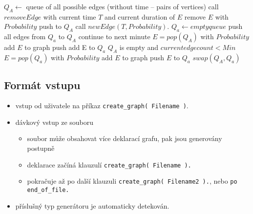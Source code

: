 \documentclass[11pt, a4paper,draft]{article}
\newcommand{\pl}[1]{\texttt{#1}} %
\theoremstyle{plain}
\theoremstyle{definition}
\theoremstyle{remark}
\begin{document}
\begin{algorithmic}[1]
    \State $Q_A \leftarrow$ queue of all possible edges (without time -- pairs of vertices)
            \State call $removeEdge$ with current time $T$ and current duration of $E$
            \State remove $E$ with $Probability$
             push to $Q_A$ \EndIf
        \EndFor
        \State call $newEdge( T, Probability )$.
        \State $Q_a \leftarrow empty queue$
                \State push all edges from $Q_a$ to $Q_A$
                \State continue to next minute
            \EndIf
            \State $E = pop( Q_A )$
            \State with $Probability$ add $E$ to graph
             push add E to $Q_a$ \EndIf
            \If $Q_A$ is empty and $current edge count < Min$
                    \State $E = pop( Q_a )$
                    \State with $Probability$ add $E$ to graph
                     push $E$ to $Q_a$ \EndIf
                \EndWhile
            \EndIf
        \EndWhile
        \State $swap( Q_A, Q_a )$ 
    \EndFor
\end{algorithmic}

\subsection{Formát vstupu}
\begin{itemize}
    \item vstup od uživatele na příkaz \pl{create\_graph( Filename )}.
    \item dávkový vstup ze souboru
        \begin{itemize}
            \item soubor může obsahovat více deklarací grafu, pak jsou generovány postupně
            \item deklarace začíná klauzulí \pl{create\_graph( Filename ).}
            \item pokračuje až po další klauzuli \pl{create\_graph( Filename2 ).}, nebo
                \pl{po end\_of\_file.}
        \end{itemize}
    \item příslušný typ generátoru je automaticky detekován.
\end{itemize}
\end{document}
